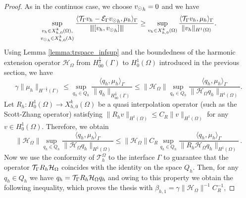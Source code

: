 \documentclass[r]{siamart171218}
\begin{document}
\begin{proof}
As in the continuos case, we choose ${v_{\odot}}_h =0$ and we have
\begin{equation*}
\sup_{\substack{v_h \in X_{h,0}^k(\Omega),\\ {v_{\odot}}_h \in X_{h,0}^k(\Lambda)}} \frac{ \langle {\mathcal{T}_\Gamma} v_h - \mathcal{E}_\Gamma {v_{\odot}}_h, \mu_h \rangle _{\Gamma}} {{\left\vert\kern-0.25ex\left\vert\kern-0.25ex\left\vert [v_h,  {v_{\odot}}_h] \right\vert\kern-0.25ex\right\vert\kern-0.25ex\right\vert}}
\geq \sup_{v_h \in X_{h,0}^k(\Omega)} \frac{ \langle {\mathcal{T}_\Gamma} v_h, \mu_h \rangle _{\Gamma} } {\|v_h\|_{H^1(\Omega)}}.
\end{equation*}
Using Lemma \ref{lemma:trspace_infsup} and the boundedness of the harmonic extension operator $\mathcal{H}_\Omega$ from $H^{\frac 12}_{00}(\Gamma)$ to $H^1_0(\Omega)$ introduced in the previous section, we have
\begin{equation*}
\gamma \|\mu_h\|_{H^{-\frac 12}(\Gamma)} \leq  \sup_{q_h \in Q_h} \frac{ \langle q_h, \mu_h \rangle _{\Gamma} } {\|q_h\|_{H^{\frac 12}_{00}(\Gamma)}} 
\leq 
\|\mathcal{H}_\Omega\| \sup_{q_h \in Q_h} \frac{ \langle q_h, \mu_h \rangle _{\Gamma} } {\|\mathcal{H}_\Omega q_h\|_{H^1(\Omega)}} .
\end{equation*}
Let $R_h: H^1_0(\Omega) \rightarrow X_{h,0}^k(\Omega)$ be a quasi interpolation operator (such as the Scott-Zhang operator) satisfying 
$\|R_h v\|_{H^1(\Omega)} \leq C_R \|v\|_{H^1(\Omega)}$ for any  $v \in H^1_0(\Omega)$.
Therefore, we obtain 
\begin{equation*}
\|\mathcal{H}_\Omega\| \sup_{q_h \in Q_h} \frac{ \langle q_h, \mu_h \rangle _{\Gamma} } {\|\mathcal{H}_\Omega q_h\|_{H^1(\Omega)}} 
\leq
\|\mathcal{H}_{\Omega}\| C_R \sup_{q_h \in Q_h} \frac{ \langle q_h, \mu_h \rangle _{\Gamma} } {\|R_h \mathcal{H}_{\Omega} q_h\|_{H^1(\Omega)}}\,.
\end{equation*}
Now we use the conformity of $\mathcal{T}^{\Omega}_h$ to the interface $\Gamma$
to guarantee that the operator ${\mathcal{T}_\Gamma} R_h  \mathcal{H}_{\Omega}$ coincides with the identity on the space $Q_h$. Then, for any $q_h \in Q_h$ we have $q_h = {\mathcal{T}_\Gamma} R_h  \mathcal{H}_{\Omega} q_h$
and owing to this property we obtain the following inequality, which proves the thesis with $\beta_{h,1} = \gamma \|\mathcal{H}_{\Omega}\|^{-1} C_R^{-1}$,

\end{proof}
\end{document}
